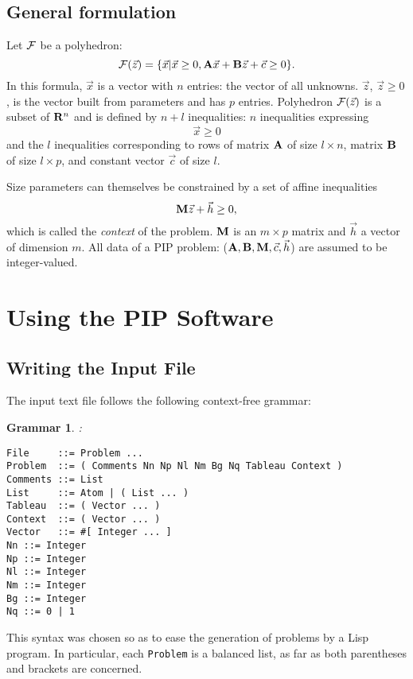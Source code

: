\documentclass[12pt,a4paper,dvips]{article}
\newtheorem{grammar}{Grammar}
\begin{document}
\subsection{General formulation}
Let ${\cal F}$ be a polyhedron:
\begin{equation}
 \label{polyedre}
{\cal F}(\vec{z})
 = \{ \vec{x} | \vec{x} \geq 0,
			{\bf A} \vec{x} + {\bf B} \vec{z} + \vec{c} \geq 0\} .
\end{equation}
In this formula, $\vec{x}$ is a vector with $n$ entries: the vector of
all unknowns. $\vec{z}$, $\vec{z}\geq 0$, is the vector built from
parameters and has $p$ entries. Polyhedron ${\cal F}(\vec{z})$ is a
subset of ${\bf R}^{n}$ and is defined by $n + l$ inequalities: $n$
inequalities expressing
\[ \vec{x} \geq 0 \]
and the $l$ inequalities corresponding to rows of matrix
${\bf A}$ of size $l \times n$, matrix ${\bf B}$ of size $l \times p$,
and constant vector $\vec{c}$ of size $l$.

Size parameters can themselves be constrained by a set of affine inequalities
\[ {\bf M} \vec{z} + \vec{h} \geq 0 ,\]
which is called the {\em context} of the problem. ${\bf M}$ is an $m
\times p$ matrix and $\vec{h}$ a vector of dimension $m$.
All data of a PIP problem: (${\bf A}, {\bf B}, {\bf M}, \vec{c}, \vec{h}$)
 are assumed to be integer-valued. 


\section{Using the PIP Software}
\label{PIP}

\subsection{Writing the Input File}
\label{specif:donnees}

The input text file follows the following context-free grammar:
\begin{grammar}
:
\label{probleme}
\begin{verbatim}
File     ::= Problem ...
Problem  ::= ( Comments Nn Np Nl Nm Bg Nq Tableau Context )
Comments ::= List
List     ::= Atom | ( List ... )
Tableau  ::= ( Vector ... )
Context  ::= ( Vector ... )
Vector   ::= #[ Integer ... ]
Nn ::= Integer
Np ::= Integer
Nl ::= Integer
Nm ::= Integer
Bg ::= Integer
Nq ::= 0 | 1
\end{verbatim}
\end{grammar}
This syntax was chosen so as to ease the generation of problems
 by a Lisp program. In
particular, each {\tt Problem} is a balanced list, as far as both
parentheses and brackets are concerned.
\end{document}
